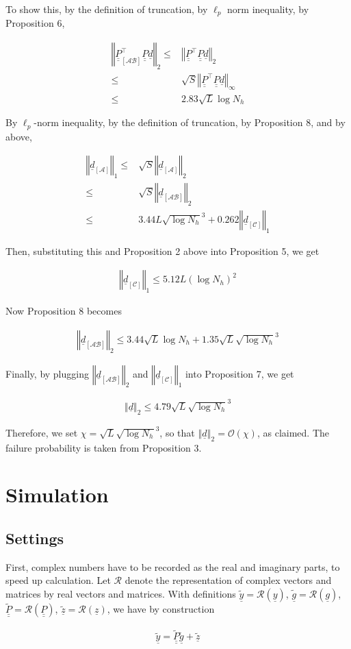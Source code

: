 \documentclass[journal]{IEEEtran}
\newcommand {\m} [1] {\( #1 \)}
\newcommand {\V} [1] {\underline {#1}}
\newcommand {\M} [1] {\underline {\underline {#1}}}
\newcommand {\RB} [1] {\left( #1 \right)}
\newcommand {\SB} [1] {\left[ #1 \right]}
\newcommand {\VNm} [1] {\left \Vert #1 \right \Vert}
\newcommand {\R} [1] {\sqrt {#1}}
\newcommand {\Disp} [1] {
   \begin {align*}
      #1
   \end {align*}
}
\begin{document}
To show this, by the definition of truncation, by \m {\ell_p} norm inequality, by Proposition 6,
\Disp {
\VNm {\M {P} _{\SB {\mathcal {AB}}}^\intercal \M {P} \V {d}} _2
\leq &\VNm {\M {P}^\intercal \M {P} \V {d}} _2 \\
\leq &\R {S} \VNm {\M {P}^\intercal \M {P} \V {d}} _\infty \\
\leq &2.83 \R {L} \log N_h
}
By \m {\ell_p}-norm inequality, by the definition of truncation, by Proposition 8, and by above,
\Disp {
\VNm {\V {d} _{\SB{\mathcal {A}}}} _1
\leq &\R {S} \VNm {\V {d} _{\SB{\mathcal {A}}}} _2 \\
\leq &\R {S} \VNm {\V {d} _{\SB{\mathcal {AB}}}} _2 \\
\leq &3.44 L \R {\log N_h}^3
+0.262 \VNm {\V {d} _{\SB{\mathcal {C}}}} _1
}
Then, substituting this and Proposition 2 above into Proposition 5, we get
\Disp {
\VNm {\V {d} _{\SB{\mathcal {C}}}} _1
\leq 5.12 L \RB {\log N_h}^2
}
Now Proposition 8 becomes
\Disp {
\VNm {\V {d} _{\SB{\mathcal {AB}}}} _2
\leq 3.44 \R {L} \log N_h + 1.35 \R {L} \R {\log N_h} ^3
}
Finally, by plugging \m {\VNm {\V {d} _{\SB{\mathcal {AB}}}} _2} and \m {\VNm {\V {d} _{\SB{\mathcal {C}}}} _1} into Proposition 7, we get
\Disp {
\VNm {\V {d}} _2
\leq 4.79 \R {L} \R {\log N_h}^3
}
Therefore, we set \m {\chi = \R {L} \R {\log N_h}^3}, so that \m {\VNm {\V {d}} _2 = \mathcal {O} \RB {\chi}}, as claimed.
The failure probability is taken from Proposition 3.



\section{Simulation}

\subsection{Settings}

First, complex numbers have to be recorded as the real and imaginary parts, to speed up calculation.
Let \m {\mathcal {R}} denote the representation of complex vectors and matrices by real vectors and matrices.
With definitions \m {\tilde {\V {y}} = \mathcal {R} \RB {\V {y}}},
\m {\tilde {\V {g}} = \mathcal {R} \RB {\V {g}}},
\m {\tilde {\M {P}} = \mathcal {R} \RB {\M {P}}},
\m {\tilde {\V {z}} = \mathcal {R} \RB {\V {z}}},
we have by construction
\Disp {
\V {\tilde {y}}
= \M {\tilde {P}} \V {\tilde {g}} +\V {\tilde {z}} 
}
\end{document}
